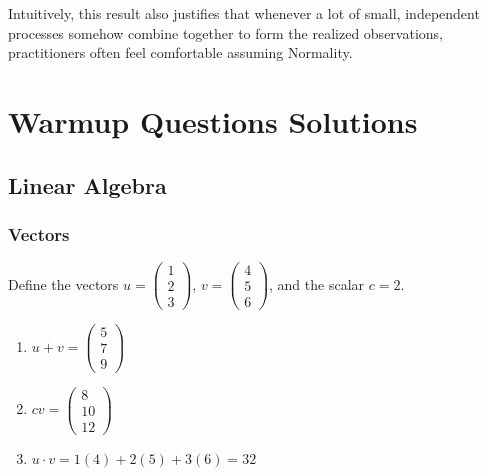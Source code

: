 \documentclass[
  letterpaper,
]{book}
\providecommand{\tightlist}{%
  \setlength{\itemsep}{0pt}\setlength{\parskip}{0pt}}\usepackage{longtable,booktabs,array}
\theoremstyle{definition}
\theoremstyle{definition}
\theoremstyle{plain}
\theoremstyle{definition}
\theoremstyle{plain}
\theoremstyle{plain}
\theoremstyle{remark}
\begin{document}
Intuitively, this result also justifies that whenever a lot of small,
independent processes somehow combine together to form the realized
observations, practitioners often feel comfortable assuming Normality.


\hypertarget{warmup-questions-solutions}{%
\chapter*{Warmup Questions Solutions}\label{warmup-questions-solutions}}

\hypertarget{linear-algebra-1}{%
\section*{Linear Algebra}\label{linear-algebra-1}}

\hypertarget{vectors-1}{%
\subsection*{Vectors}\label{vectors-1}}

Define the vectors \(u = \begin{pmatrix} 1 \\2 \\3 \end{pmatrix}\),
\(v = \begin{pmatrix} 4\\5\\6 \end{pmatrix}\), and the scalar \(c = 2\).

\begin{enumerate}
\def\labelenumi{\arabic{enumi}.}
\tightlist
\item
  \(u + v = \begin{pmatrix}5\\7\\9\end{pmatrix}\)
\item
  \(cv = \begin{pmatrix}8\\10\\12\end{pmatrix}\)
\item
  \(u \cdot v = 1(4) + 2(5) + 3(6) = 32\)
\end{enumerate}
\end{document}
